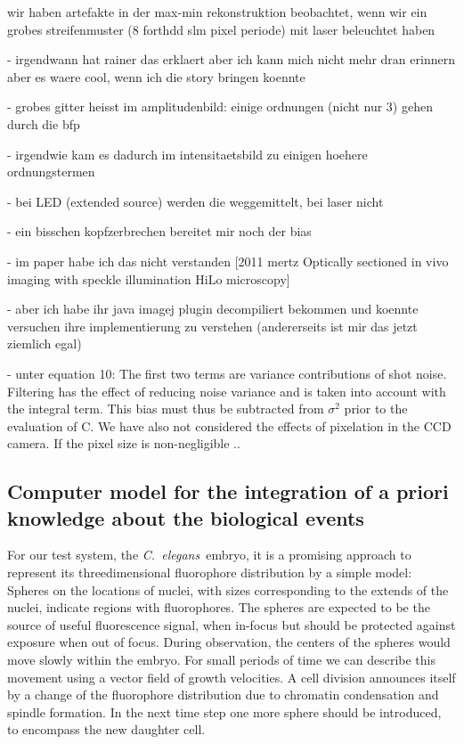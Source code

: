 {\color{red} wir haben artefakte in der max-min rekonstruktion
  beobachtet, wenn wir ein grobes streifenmuster (8 forthdd slm pixel
  periode) mit laser beleuchtet haben

     - irgendwann hat rainer das erklaert aber ich kann mich nicht
       mehr dran erinnern aber es waere cool, wenn ich die story
       bringen koennte
     
- grobes gitter heisst im amplitudenbild: einige ordnungen (nicht
       nur 3) gehen durch die bfp

     - irgendwie kam es dadurch im intensitaetsbild zu einigen hoehere
       ordnungstermen

     - bei LED (extended source) werden die weggemittelt, bei laser
       nicht

       - ein bisschen kopfzerbrechen bereitet mir noch der bias 

       - im paper habe ich das nicht verstanden [2011 mertz Optically
       sectioned in vivo imaging with speckle illumination HiLo
       microscopy]

       - aber ich habe ihr java imagej plugin decompiliert bekommen
       und koennte versuchen ihre implementierung zu verstehen
       (andererseits ist mir das jetzt ziemlich egal)

       - unter equation 10: The first two terms are variance
       contributions of shot noise. Filtering has the effect of
       reducing noise variance and is taken into account with the
       integral term. This bias must thus be subtracted from
       $\sigma^2$ prior to the evaluation of C. We have also not
       considered the effects of pixelation in the CCD camera. If the
       pixel size is non-negligible ..  }
\newcommand{\celegans}{\emph{C.~elegans}}
\subsection{Computer model for the integration of a priori knowledge
  about the biological events}
For our test system, the \celegans\ embryo, it is a promising approach
to represent its threedimensional fluorophore distribution by a simple
model: Spheres on the locations of nuclei, with sizes corresponding to
the extends of the nuclei, indicate regions with fluorophores. The
spheres are expected to be the source of useful fluorescence signal,
when in-focus but should be protected against exposure when out of
focus. During observation, the centers of the spheres would move
slowly within the embryo. For small periods of time we can describe
this movement using a vector field of growth velocities.  A cell
division announces itself by a change of the fluorophore distribution
due to chromatin condensation and spindle formation. In the next time
step one more sphere should be introduced, to encompass the new
daughter cell.

